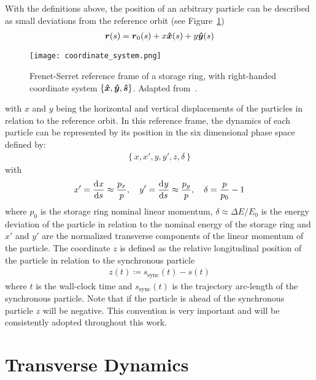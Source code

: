     With the definitions above, the position of an arbitrary particle can be described as small deviations from the reference orbit (see Figure~\ref{fig:reference_frame})
    \begin{align}
        \boldsymbol{r}(s) = \boldsymbol{r}_0(s) + x\boldsymbol{\hat x}(s) + y\boldsymbol{\hat y}(s)
    \end{align}
    \begin{figure}
        \centering
        \texttt{[image: coordinate\_system.png]}
        \caption[Frenet-Serret reference frame of a storage ring]{Frenet-Serret reference frame of a storage ring, with right-handed coordinate system $\{ \boldsymbol{\hat x}, \boldsymbol{\hat y}, \boldsymbol{\hat s} \}$. Adapted from~\cite[pp. 123]{Lee1999}.}
        \label{fig:reference_frame}
    \end{figure}
    with $x$ and $y$ being the horizontal and vertical displacements of the particles in relation to the reference orbit. In this reference frame, the dynamics of each particle can be represented by its position in the six dimensional phase space defined by:
    \begin{align}\label{eq:phase_space_definition}
        \left\{ x, x', y, y', z, \delta \right\}
    \end{align}
    with
    \begin{align}
        x' = \frac{\mathrm{d}^{{}}x}{\mathrm{d} s^{{}}} \approx \frac{p_x}{p},\quad
        y' = \frac{\mathrm{d}^{{}}y}{\mathrm{d} s^{{}}} \approx \frac{p_y}{p},\quad
        \delta = \frac{p}{p_0}-1
    \end{align}
    where $p_0$ is the storage ring nominal linear momentum, $\delta \approx \Delta E/E_0$ is the energy deviation of the particle in relation to the nominal energy of the storage ring and $x'$ and $y'$ are the normalized transverse components of the linear momentum of the particle. The coordinate $z$ is defined as the relative longitudinal position of the particle in relation to the synchronous particle
    \begin{align}\label{eq:longitudinal_deviations}
        z(t) \coloneqq s_\text{sync}(t) - s(t)
    \end{align}
    where $t$ is the wall-clock time and $s_\text{sync}(t)$ is the trajectory arc-length of the synchronous particle. Note that if the particle is ahead of the synchronous particle $z$ will be negative. This convention is very important and will be consistently adopted throughout this work.

\section{Transverse Dynamics}

